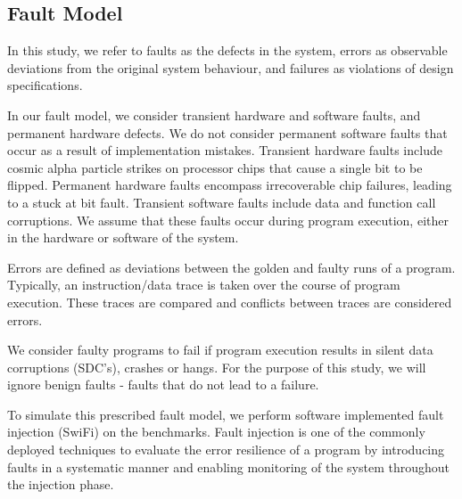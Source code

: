 \subsection{Fault Model}

In this study, we refer to faults as the defects in the system, errors as observable deviations from the original system behaviour, and failures as violations of design specifications.

In our fault model, we consider transient hardware and software faults, and permanent hardware defects.
We do not consider permanent software faults that occur as a result of implementation mistakes.
Transient hardware faults include cosmic alpha particle strikes on processor chips that cause a single bit to be flipped.
Permanent hardware faults encompass irrecoverable chip failures, leading to a stuck at bit fault.
Transient software faults include data and function call corruptions. 
We assume that these faults occur during program execution, either in the hardware or software of the system. 

Errors are defined as deviations between the golden and faulty runs of a program.
Typically, an instruction/data trace is taken over the course of program execution. 
These traces are compared and conflicts between traces are considered errors.

We consider faulty programs to fail if program execution results in silent data corruptions (SDC's), crashes or hangs. For the purpose of this study, we will ignore benign faults - faults that do not lead to a failure.

To simulate this prescribed fault model, we perform software implemented fault injection (SwiFi) on the benchmarks.  
Fault injection is one of the commonly deployed techniques to evaluate the error resilience of a program by introducing faults in a systematic manner and enabling monitoring of the system throughout the injection phase.

